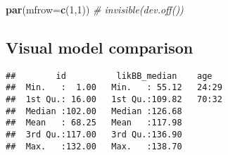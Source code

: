 \documentclass[11pt,,]{article}
\newenvironment{Shaded}{\begin{snugshade}}{\end{snugshade}}
\newcommand{\KeywordTok}[1]{\textcolor[rgb]{0.13,0.29,0.53}{\textbf{{#1}}}}
\newcommand{\DataTypeTok}[1]{\textcolor[rgb]{0.13,0.29,0.53}{{#1}}}
\newcommand{\DecValTok}[1]{\textcolor[rgb]{0.00,0.00,0.81}{{#1}}}
\newcommand{\StringTok}[1]{\textcolor[rgb]{0.31,0.60,0.02}{{#1}}}
\newcommand{\CommentTok}[1]{\textcolor[rgb]{0.56,0.35,0.01}{\textit{{#1}}}}
\newcommand{\OtherTok}[1]{\textcolor[rgb]{0.56,0.35,0.01}{{#1}}}
\newcommand{\NormalTok}[1]{{#1}}
\begin{document}
\begin{Shaded}
\begin{Highlighting}[]
\KeywordTok{par}\NormalTok{(}\DataTypeTok{mfrow=}\KeywordTok{c}\NormalTok{(}\DecValTok{1}\NormalTok{,}\DecValTok{1}\NormalTok{))}
\CommentTok{# invisible(dev.off())}
\end{Highlighting}
\end{Shaded}

\newpage

\newpage

\subsection{Visual model comparison}\label{visual-model-comparison}

\begin{Shaded}
\end{Shaded}

\begin{verbatim}
##        id          likBB_median    age    
##  Min.   :  1.00   Min.   : 55.12   24:29  
##  1st Qu.: 16.00   1st Qu.:109.82   70:32  
##  Median :102.00   Median :126.68          
##  Mean   : 68.25   Mean   :117.98          
##  3rd Qu.:117.00   3rd Qu.:136.90          
##  Max.   :132.00   Max.   :138.70
\end{verbatim}
\end{document}
